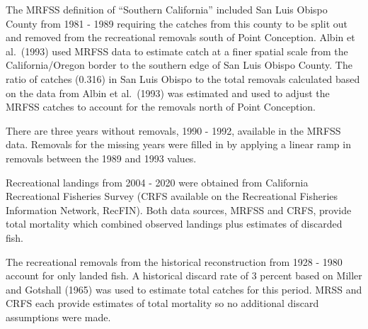 \documentclass[11pt,
  english,
  a4paper,
]{article}
\begin{document}

The MRFSS definition of ``Southern California'' included San Luis Obispo County from 1981 - 1989 requiring the catches from this county to be split out and removed from the recreational removals south of Point Conception. Albin et al.~{(1993)\leavevmode\tagmcend\tagstructend} used MRFSS data to estimate catch at a finer spatial scale from the California/Oregon border to the southern edge of San Luis Obispo County. The ratio of catches (0.316) in San Luis Obispo to the total removals calculated based on the data from Albin et al.~{(1993)\leavevmode\tagmcend\tagstructend} was estimated and used to adjust the MRFSS catches to account for the removals north of Point Conception.

\leavevmode\tagmcend\tagstructend\par


There are three years without removals, 1990 - 1992, available in the MRFSS data. Removals for the missing years were filled in by applying a linear ramp in removals between the 1989 and 1993 values.

\leavevmode\tagmcend\tagstructend\par


Recreational landings from 2004 - 2020 were obtained from California Recreational Fisheries Survey (CRFS available on the Recreational Fisheries Information Network, RecFIN). Both data sources, MRFSS and CRFS, provide total mortality which combined observed landings plus estimates of discarded fish.

\leavevmode\tagmcend\tagstructend\par


The recreational removals from the historical reconstruction from 1928 - 1980 account for only landed fish. A historical discard rate of 3 percent based on Miller and Gotshall {(1965)\leavevmode\tagmcend\tagstructend} was used to estimate total catches for this period. MRSS and CRFS each provide estimates of total mortality so no additional discard assumptions were made.

\leavevmode\tagmcend\tagstructend\par
\end{document}
